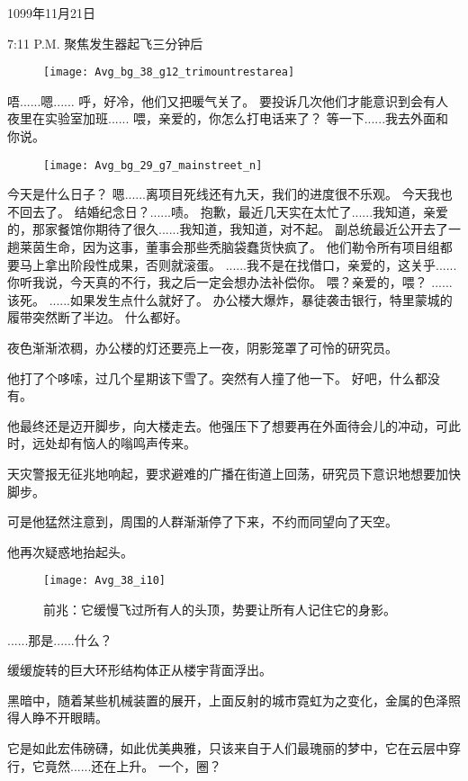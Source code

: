 \documentclass[openany]{book}
\begin{document}
1099年11月21日\par
7:11 P.M. 聚焦发生器起飞三分钟后
\begin{figure}[h]
    \centering
    \texttt{[image: Avg\_bg\_38\_g12\_trimountrestarea]}
\end{figure}
\begin{dialogue}
     唔......嗯......
     呼，好冷，他们又把暖气关了。
     要投诉几次他们才能意识到会有人夜里在实验室加班......
     喂，亲爱的，你怎么打电话来了？
     等一下......我去外面和你说。
    \begin{figure}[h]
        \centering
        \texttt{[image: Avg\_bg\_29\_g7\_mainstreet\_n]}
    \end{figure}
     今天是什么日子？
     嗯......离项目死线还有九天，我们的进度很不乐观。
     今天我也不回去了。
     结婚纪念日？......啧。
     抱歉，最近几天实在太忙了......我知道，亲爱的，那家餐馆你期待了很久......我知道，我知道，对不起。
     副总统最近公开去了一趟莱茵生命，因为这事，董事会那些秃脑袋蠢货快疯了。
     他们勒令所有项目组都要马上拿出阶段性成果，否则就滚蛋。
     ......我不是在找借口，亲爱的，这关乎......你听我说，今天真的不行，我之后一定会想办法补偿你。
     喂？亲爱的，喂？
     ......该死。
     ......如果发生点什么就好了。
     办公楼大爆炸，暴徒袭击银行，特里蒙城的履带突然断了半边。
     什么都好。\par
    夜色渐渐浓稠，办公楼的灯还要亮上一夜，阴影笼罩了可怜的研究员。\par
    他打了个哆嗦，过几个星期该下雪了。突然有人撞了他一下。
     好吧，什么都没有。\par
    他最终还是迈开脚步，向大楼走去。他强压下了想要再在外面待会儿的冲动，可此时，远处却有恼人的嗡鸣声传来。\par
    天灾警报无征兆地响起，要求避难的广播在街道上回荡，研究员下意识地想要加快脚步。\par
    可是他猛然注意到，周围的人群渐渐停了下来，不约而同望向了天空。\par
    他再次疑惑地抬起头。
    \begin{figure}[h]
        \caption*{前兆：它缓慢飞过所有人的头顶，势要让所有人记住它的身影。}
        \centering
        \texttt{[image: Avg\_38\_i10]}
    \end{figure}
     ......那是......什么？\par
    缓缓旋转的巨大环形结构体正从楼宇背面浮出。\par
    黑暗中，随着某些机械装置的展开，上面反射的城市霓虹为之变化，金属的色泽照得人睁不开眼睛。\par
    它是如此宏伟磅礴，如此优美典雅，只该来自于人们最瑰丽的梦中，它在云层中穿行，它竟然......还在上升。
     一个，圈？
\end{dialogue}
\end{document}
